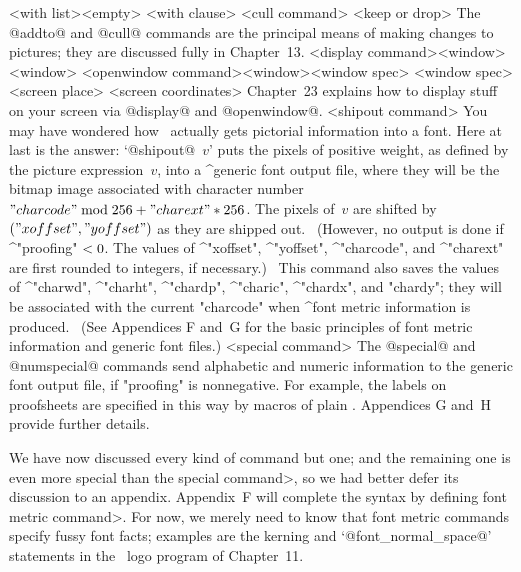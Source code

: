 <with list>\is<empty>
<with clause>%
 \kern-3.5pt
<cull command>
 \alt<cull command>[withweight]<numeric expression>
<keep or drop>\is[keeping]\alt[dropping]
\endsyntax
The @addto@ and @cull@ commands are the principal means of making
changes to pictures; they are discussed fully in Chapter~13.
\beginsyntax
<display command><window>
<window>
<openwindow command>\is[openwindow]<window><window spec>
<window spec>
<screen place>
<screen coordinates>
\endsyntax
Chapter~23 explains how to display stuff on your screen via @display@
and @openwindow@\kern-1pt.
\beginsyntax
<shipout command>
\endsyntax
You may have wondered how \MF\ actually gets pictorial information into
a font. Here at last is the answer: `@shipout@~$v$' puts the pixels of
positive weight, as defined by the picture expression~$v$, into a ^{generic
font} output file, where they will be the bitmap image associated with
character number $"charcode"\bmod256+"charext"\ast256$. The pixels of~$v$
are shifted by $("xoffset","yoffset")$ as they are shipped out.
\ (However, no output is done if ^"proofing"$\null<0$. The values of
^"xoffset", ^"yoffset", ^"charcode", and ^"charext" are first rounded to
integers, if necessary.) \ This command also saves the values of
^"charwd", ^"charht", ^"chardp", ^"charic", ^"chardx", and "chardy"; they
will be associated with the current "charcode" when ^{font metric
information} is produced. \ (See Appendices F and~G for the basic
principles of font metric information and generic font files.)
\beginsyntax
<special command>
\endsyntax
The @special@ and @numspecial@ commands send alphabetic and numeric
information
to the generic font output file, if "proofing" is nonnegative.
For example, the labels on proofsheets are specified in this
way by macros of plain \MF\!\null. Appendices G and~H provide further details.

\medbreak
We have now discussed every kind of command but one; and the remaining
one is even more special than the \<special command>, so we had better
defer its discussion to an appendix. Appendix~F will complete the syntax
by defining \<font metric command>. For now, we merely need to know that
font metric commands specify fussy font facts; examples are the kerning and
`@font\_normal\_space@' statements in the \MF\ logo program of Chapter~11.

